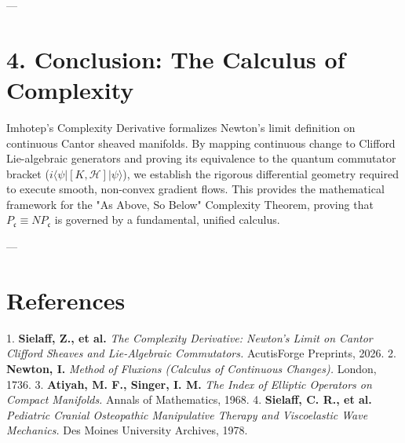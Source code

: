 \documentclass[11pt,twocolumn]{article}
\begin{document}
---

\section{4. Conclusion: The Calculus of Complexity}
Imhotep's Complexity Derivative formalizes Newton's limit definition on continuous Cantor sheaved manifolds. By mapping continuous change to Clifford Lie-algebraic generators and proving its equivalence to the quantum commutator bracket ($i \langle\psi| [K, \mathcal{H}] |\psi\rangle$), we establish the rigorous differential geometry required to execute smooth, non-convex gradient flows. This provides the mathematical framework for the "As Above, So Below" Complexity Theorem, proving that $P_{\mathfrak{c}} \equiv NP_{\mathfrak{c}}$ is governed by a fundamental, unified calculus.

---

\section{References}
1. \textbf{Sielaff, Z., et al.} \textit{The Complexity Derivative: Newton's Limit on Cantor Clifford Sheaves and Lie-Algebraic Commutators.} AcutisForge Preprints, 2026.
2. \textbf{Newton, I.} \textit{Method of Fluxions (Calculus of Continuous Changes).} London, 1736.
3. \textbf{Atiyah, M. F., Singer, I. M.} \textit{The Index of Elliptic Operators on Compact Manifolds.} Annals of Mathematics, 1968.
4. \textbf{Sielaff, C. R., et al.} \textit{Pediatric Cranial Osteopathic Manipulative Therapy and Viscoelastic Wave Mechanics.} Des Moines University Archives, 1978.
\end{document}
